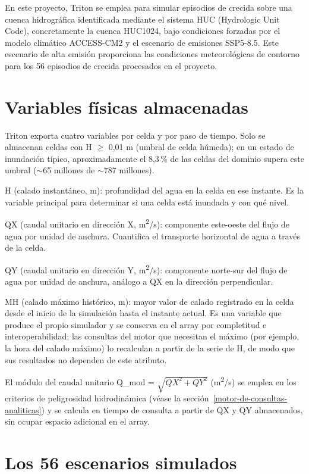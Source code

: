 En este proyecto, Triton se emplea para simular episodios de crecida sobre una cuenca hidrográfica identificada mediante el sistema HUC (Hydrologic Unit Code), concretamente la cuenca HUC1024, bajo condiciones forzadas por el modelo climático ACCESS-CM2 y el escenario de emisiones SSP5-8.5. Este escenario de alta emisión proporciona las condiciones meteorológicas de contorno para los 56 episodios de crecida procesados en el proyecto.

\section{Variables físicas almacenadas}\label{c.3-variables-fisicas-almacenadas}

Triton exporta cuatro variables por celda y por paso de tiempo. Solo se almacenan celdas con H $\geq$ 0,01 m (umbral de celda húmeda); en un estado de inundación típico, aproximadamente el 8,3\,\% de las celdas del dominio supera este umbral ($\sim$65 millones de $\sim$787 millones).

H (calado instantáneo, m): profundidad del agua en la celda en ese instante. Es la variable principal para determinar si una celda está inundada y con qué nivel.

QX (caudal unitario en dirección X, m\textsuperscript{2}/s): componente este-oeste del flujo de agua por unidad de anchura. Cuantifica el transporte horizontal de agua a través de la celda.

QY (caudal unitario en dirección Y, m\textsuperscript{2}/s): componente norte-sur del flujo de agua por unidad de anchura, análogo a QX en la dirección perpendicular.

MH (calado máximo histórico, m): mayor valor de calado registrado en la celda desde el inicio de la simulación hasta el instante actual. Es una variable que produce el propio simulador y se conserva en el array por completitud e interoperabilidad; las consultas del motor que necesitan el máximo (por ejemplo, la hora del calado máximo) lo recalculan a partir de la serie de H, de modo que sus resultados no dependen de este atributo.

El módulo del caudal unitario Q\_mod = $\sqrt{QX^2 + QY^2}$ (m\textsuperscript{2}/s) se emplea en los criterios de peligrosidad hidrodinámica (véase la sección~\ref{motor-de-consultas-analiticas}) y se calcula en tiempo de consulta a partir de QX y QY almacenados, sin ocupar espacio adicional en el array.

\section{Los 56 escenarios simulados}\label{c.4-los-56-escenarios-simulados}

